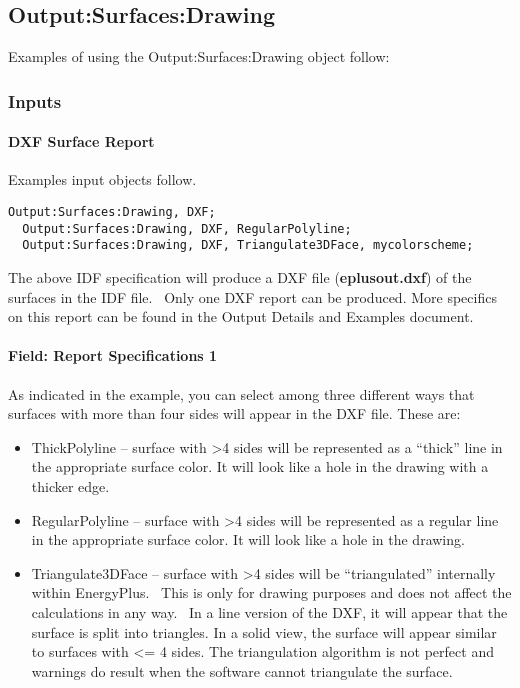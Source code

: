 \subsection{Output:Surfaces:Drawing}\label{outputsurfacesdrawing}

Examples of using the Output:Surfaces:Drawing object follow:

\subsubsection{Inputs}\label{inputs-1-037}

\paragraph{DXF Surface Report}\label{dxf-surface-report}

Examples input objects follow.

\begin{lstlisting}
Output:Surfaces:Drawing, DXF;
  Output:Surfaces:Drawing, DXF, RegularPolyline;
  Output:Surfaces:Drawing, DXF, Triangulate3DFace, mycolorscheme;
\end{lstlisting}

The above IDF specification will produce a DXF file (\textbf{eplusout.dxf}) of the surfaces in the IDF file.~ Only one DXF report can be produced. More specifics on this report can be found in the Output Details and Examples document.

\paragraph{Field: Report Specifications 1}\label{field-report-specifications-1}

As indicated in the example, you can select among three different ways that surfaces with more than four sides will appear in the DXF file. These are:

\begin{itemize}
\item
  ThickPolyline -- surface with \textgreater{}4 sides will be represented as a ``thick'' line in the appropriate surface color. It will look like a hole in the drawing with a thicker edge.
\item
  RegularPolyline -- surface with \textgreater{}4 sides will be represented as a regular line in the appropriate surface color. It will look like a hole in the drawing.
\item
  Triangulate3DFace -- surface with \textgreater{}4 sides will be ``triangulated'' internally within EnergyPlus.~ This is only for drawing purposes and does not affect the calculations in any way.~ In a line version of the DXF, it will appear that the surface is split into triangles. In a solid view, the surface will appear similar to surfaces with \textless{}= 4 sides. The triangulation algorithm is not perfect and warnings do result when the software cannot triangulate the surface.
\end{itemize}

